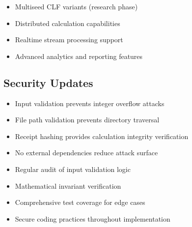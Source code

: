 \documentclass[letterpaper,10pt,english]{sphinxmanual}
\begin{document}
\sphinxAtStartPar
{}
\begin{itemize}
\item {} 
\sphinxAtStartPar
Multi\sphinxhyphen{}seed CLF variants (research phase)

\item {} 
\sphinxAtStartPar
Distributed calculation capabilities

\item {} 
\sphinxAtStartPar
Real\sphinxhyphen{}time stream processing support

\item {} 
\sphinxAtStartPar
Advanced analytics and reporting features

\end{itemize}


\subsection{Security Updates}
\label{\detokenize{changelog:security-updates}}
\sphinxAtStartPar
{}
\begin{itemize}
\item {} 
\sphinxAtStartPar
Input validation prevents integer overflow attacks

\item {} 
\sphinxAtStartPar
File path validation prevents directory traversal

\item {} 
\sphinxAtStartPar
Receipt hashing provides calculation integrity verification

\item {} 
\sphinxAtStartPar
No external dependencies reduce attack surface

\end{itemize}

\sphinxAtStartPar
{}
\begin{itemize}
\item {} 
\sphinxAtStartPar
Regular audit of input validation logic

\item {} 
\sphinxAtStartPar
Mathematical invariant verification

\item {} 
\sphinxAtStartPar
Comprehensive test coverage for edge cases

\item {} 
\sphinxAtStartPar
Secure coding practices throughout implementation

\end{itemize}
\end{document}

